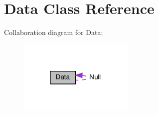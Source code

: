 \hypertarget{classData}{}\section{Data Class Reference}
\label{classData}


Collaboration diagram for Data\+:
\nopagebreak
\begin{figure}[H]
\begin{center}
\leavevmode
\includegraphics[width=157pt]{classData__coll__graph}
\end{center}
\end{figure}
